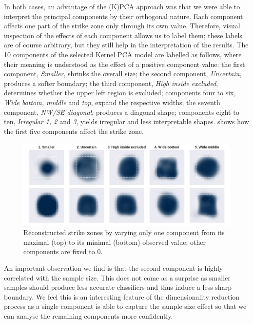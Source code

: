 \documentclass[letterpaper,12pt]{article}
\begin{document}
In both cases, an advantage of the (K)PCA approach was that we were able to interpret the principal components by their orthogonal nature. 
Each component affects one part of the strike zone only through its own value.
Therefore, visual inspection of the effects of each component allows us to label them; these labels are of course arbitrary, but they still help in the interpretation of the results. 
The 10 components of the selected Kernel PCA model are labelled as follows, where their meaning is understood as the effect of a positive component value: the first component, \textit{Smaller}, shrinks the overall size; the second component, \textit{Uncertain}, produces a softer boundary; the third component, \textit{High inside excluded}, determines whether the upper left region is excluded; components four to six, \textit{Wide bottom, middle} and \textit{top}, expand the respective widths; the seventh component, \textit{NW/SE diagonal}, produces a diagonal shape; components eight to ten, \textit{Irregular 1, 2} and \textit{3}, yields irregular and less interpretable shapes.  shows how the first five components affect the strike zone.

\begin{figure}
    \centering
    \includegraphics[width=\textwidth]{fig/encoding_components.pdf}
    \caption{Reconstructed strike zones by varying only one component from its maximal (top) to its minimal (bottom) observed value; other components are fixed to 0.}
    \label{fig:encoding.components}
\end{figure}

An important observation we find is that the second component is highly correlated with the sample size. This does not come as a surprise as smaller samples should produce less accurate classifiers and thus induce a less sharp boundary. We feel this is an interesting feature of the dimensionality reduction process as a single component is able to capture the sample size effect so that we can analyse the remaining components more confidently.
\end{document}
